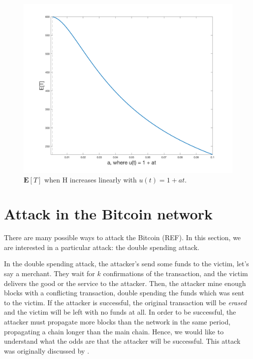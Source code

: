 \begin{figure}[ht]
\centering\includegraphics[width=\textwidth]{./images01/bitcoin-H-increasing.png}
\caption{$\mathbf{E}[T]$ when H increases linearly with $u(t) = 1 + at$.\label{fig-bitcoin-H-increase}}
\end{figure}


\section{Attack in the Bitcoin network}

There are many possible ways to attack the Bitcoin (REF). In this section, we are interested in a particular attack: the double spending attack.

In the double spending attack, the attacker's send some funds to the victim, let's say a merchant. They wait for $k$ confirmations of the transaction, and the victim delivers the good or the service to the attacker. Then, the attacker mine enough blocks with a conflicting transaction, double spending the funds which was sent to the victim. If the attacker is successful, the original transaction will be \textit{erased} and the victim will be left with no funds at all. In order to be successful, the attacker must propagate more blocks than the network in the same period, propagating a chain longer than the main chain. Hence, we would like to understand what the odds are that the attacker will be successful. This attack was originally discussed by \citet{nakamoto2008bitcoin}.

